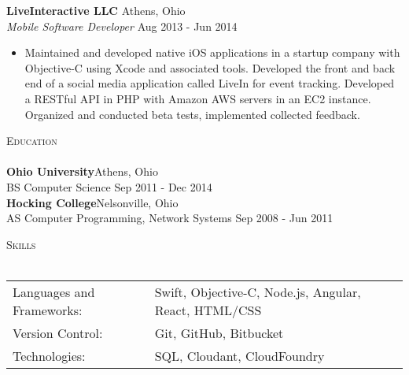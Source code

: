 \documentclass[a4paper]{article}
\newcommand{\lineunder} {
    \vspace*{-8pt} \\
    \hspace*{-18pt} \hrulefill \\
}
\newcommand{\header} [1] {
    {\hspace*{-18pt}\vspace*{6pt} \textsc{#1}}
    \vspace*{-6pt} \lineunder
}
\begin{document}
\textbf{LiveInteractive LLC} \hfill Athens, Ohio\\
\textit{Mobile Software Developer} \hfill Aug 2013 - Jun 2014\\
\vspace{-1mm}
\begin{itemize} \itemsep 1pt
	\item Maintained and developed native iOS applications in a startup company with Objective-C using Xcode and associated tools. Developed the front and back end of a social media application called LiveIn for event tracking. Developed a RESTful API in PHP with Amazon AWS servers in an EC2 instance. Organized and conducted beta tests, implemented collected feedback.
\end{itemize}

\header{Education}
\textbf{Ohio University}\hfill Athens, Ohio\\
BS Computer Science \hfill Sep 2011 - Dec 2014\\
\vspace{2mm}
\textbf{Hocking College}\hfill Nelsonville, Ohio\\
AS Computer Programming, Network Systems \hfill Sep 2008 - Jun 2011\\
\vspace{2mm}

\header{Skills}
\begin{tabular}{ l l }
	Languages and Frameworks: & Swift, Objective-C, Node.js, Angular, React, HTML/CSS \\
	Version Control:          & Git, GitHub, Bitbucket                                \\
	Technologies:             & SQL, Cloudant, CloudFoundry                           \\
\end{tabular}
\vspace{2mm}
\end{document}
